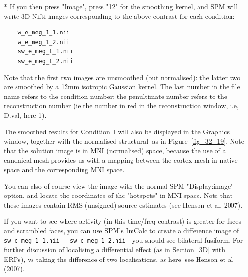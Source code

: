 * If you then press "Image", press "12" for the smoothing kernel, and SPM will write 3D Nifti images corresponding to the above contrast for each condition:
\begin{verbatim}
    w_e_meg_1_1.nii
    w_e_meg_1_2.nii
    sw_e_meg_1_1.nii
    sw_e_meg_1_2.nii
\end{verbatim}
Note that the first two images are unsmoothed (but normalised); the latter two are smoothed by a 12mm isotropic Gaussian kernel. The last number in the file name refers to the condition number; the penultimate number refers to the reconstruction number (ie the number in red in the reconstruction window, i.e, D.val, here 1).

The smoothed results for Condition 1 will also be displayed in the Graphics window, together with the normalised structural, as in Figure~\ref{fig_32_19}. Note that the solution image is in MNI (normalised) space, because the use of a canonical mesh provides us with a mapping between the cortex mesh in native space and the corresponding MNI space.

You can also of course view the image with the normal SPM "Display:image" option, and locate the coordinates of the "hotspots" in MNI space. Note that these images contain RMS (unsigned) source estimates (see Henson et al, 2007).

If you want to see where activity (in this time/freq contrast) is greater for faces and scrambled faces, you can use SPM's ImCalc to create a difference image of \verb!sw_e_meg_1_1.nii - sw_e_meg_1_2.nii! - you should see bilateral fusiform. For further discussion of localising a differential effect (as in Section~\ref{3D} with ERPs), vs taking the difference of two localisations, as here, see Henson et al (2007).

    

